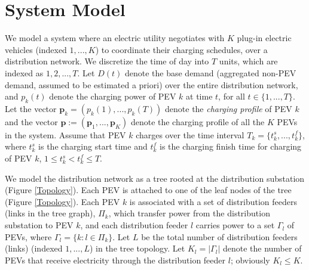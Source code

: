\documentclass[12pt,draftcls,onecolumn]{IEEEtran}
\begin{document}
\section{System Model}\label{sec:model}
\indent We model a system where an electric utility negotiates with $K$ plug-in electric vehicles (indexed $1, ..., K$)  to coordinate their charging schedules, over a distribution network. We discretize the time of day into $T$ units, which are indexed as $1, 2, ..., T$. Let $D(t)$ denote the base demand (aggregated non-PEV demand, assumed to be estimated a priori) over the entire distribution network, and $p_k(t)$ denote the charging power of PEV $k$ at time $t$, for all $t \in \{1, ..., T\}$. Let the vector $\mathbf{p}_k=(p_k(1), ..., p_k(T))$ denote the \emph{charging profile} of PEV $k$ and the vector $\mathbf{p}:= (\mathbf{p}_1, ..., \mathbf{p}_K)$ denote the charging profile of all the $K$ PEVs in the system. Assume that PEV $k$ charges over the time interval $T_k=\{t^s_k, ..., t^f_k\}$, where $t^s_k$ is the charging start time and $t^f_k$ is the charging finish time for charging of PEV $k$, $1 \leq t^s_k < t^f_k \leq T$.

We model the distribution network as a tree rooted at the distribution substation (Figure \ref{Topology}). Each PEV is attached to one of the leaf nodes of the tree (Figure \ref{Topology}). Each PEV $k$ is associated with a set of distribution feeders (links in the tree graph), $\Pi_k$, which transfer power from the distribution substation to PEV $k$, and each distribution feeder $l$ carries power to a set $\Gamma_l$ of PEVs, where $\Gamma_l=\{k: l \in \Pi_k\}$. Let $L$ be the total number of distribution feeders (links) (indexed $1, ..., L$) in the tree topology. Let $K_l=|\Gamma_l|$ denote the number of PEVs that receive electricity through the distribution feeder $l$; obviously $K_l \leq K$.
\end{document}
